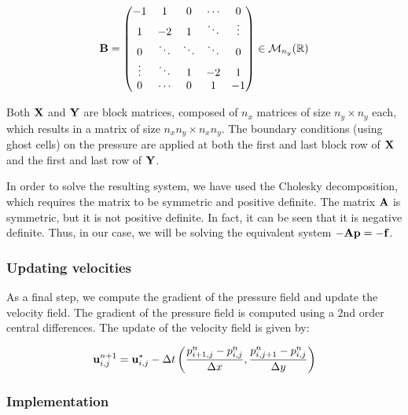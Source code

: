 $$
  \boldsymbol{\mathrm{B}} = \begin{pmatrix}
    -1     & 1      & 0      & \cdots & 0      \\
    1      & -2     & 1      & \ddots & \vdots \\
    0      & \ddots & \ddots & \ddots & 0      \\
    \vdots & \ddots & 1      & -2     & 1      \\
    0      & \cdots & 0      & 1      & -1     \\
  \end{pmatrix}\in\mathcal{M}_{n_y}(\mathbb{R})
$$

Both $\boldsymbol{\mathrm{X}}$ and $\boldsymbol{\mathrm{Y}}$ are block matrices, composed of $n_x$ matrices of size $n_y\times n_y$ each, which results in a matrix of size $n_xn_y\times n_xn_y$.
The boundary conditions (using ghost cells) on the pressure are applied at both the first and last block row of $\boldsymbol{\mathrm{X}}$ and the first and last row of $\boldsymbol{\mathrm{Y}}$.

In order to solve the resulting system, we have used the Cholesky decomposition, which requires the matrix to be symmetric and positive definite. The matrix $\boldsymbol{\mathrm{A}}$ is symmetric, but it is not positive definite. In fact, it can be seen that it is negative definite. Thus, in our case, we will be solving the equivalent system $-\boldsymbol{\mathrm{A}} \boldsymbol{\mathrm{p}} = -\boldsymbol{\mathrm{f}}$.


\subsubsection*{Updating velocities}

As a final step, we compute the gradient of the pressure field and update the velocity field. The gradient of the pressure field is computed using a 2nd order central differences. The update of the velocity field is given by:

\begin{equation*}
  \boldsymbol{\mathrm{u}}_{i,j}^{n+1} = \boldsymbol{\mathrm{u}}_{i,j}^* - \Delta t \left(
  \frac{p_{i+1,j}^{n} - p_{i,j}^{n}}{\Delta x}, \frac{p_{i,j+1}^{n} - p_{i,j}^{n}}{\Delta y}
  \right)
\end{equation*}

\subsubsection*{Implementation}

